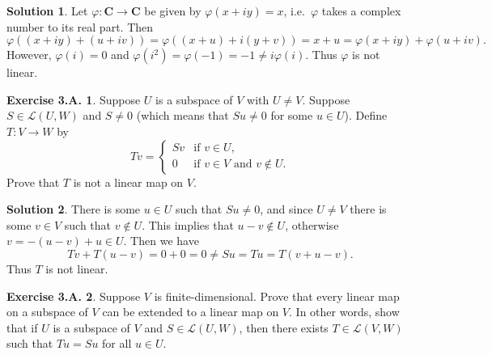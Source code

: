\documentclass[12pt]{article}
\theoremstyle{definition}
\theoremstyle{exercise}
\newtheorem{exercise}{Exercise 3.A.}
\theoremstyle{solution}
\newtheorem*{solution}{Solution}
\newcommand{\lmap}{\mathcal{L}}
\newcommand{\C}{\mathbf{C}}
\begin{document}
\begin{solution}
    Let \( \varphi : \C \to \C \) be given by \( \varphi(x + iy) = x \), i.e.\ \( \varphi \) takes a complex number to its real part. Then
    \[
        \varphi((x + iy) + (u + iv)) = \varphi((x + u) + i(y + v)) = x + u = \varphi(x + iy) + \varphi(u + iv).
    \]
    However, \( \varphi(i) = 0 \) and \( \varphi(i^2) = \varphi(-1) = -1 \neq i \varphi(i) \). Thus \( \varphi \) is not linear.
\end{solution}

\begin{exercise}
\label{ex:10}
    Suppose \( U \) is a subspace of \( V \) with \( U \neq V \). Suppose \( S \in \lmap(U, W) \) and \( S \neq 0 \) (which means that \( Su \neq 0 \) for some \( u \in U \)). Define \( T : V \to W \) by
    \[
        Tv = \begin{cases}
            Sv & \text{if } v \in U, \\
            0 & \text{if } v \in V \text{ and } v \not\in U.
        \end{cases}
    \]
    Prove that \( T \) is not a linear map on \( V \).
\end{exercise}

\begin{solution}
    There is some \( u \in U \) such that \( Su \neq 0 \), and since \( U \neq V \) there is some \( v \in V \) such that \( v \not\in U \). This implies that \( u - v \not\in U \), otherwise \( v = -(u - v) + u \in U \). Then we have
    \[
        Tv + T(u - v) = 0 + 0 = 0 \neq Su = Tu = T(v + u - v).
    \]
    Thus \( T \) is not linear.
\end{solution}

\begin{exercise}
\label{ex:11}
    Suppose \( V \) is finite-dimensional. Prove that every linear map on a subspace of \( V \) can be extended to a linear map on \( V \). In other words, show that if \( U \) is a subspace of \( V \) and \( S \in \lmap(U, W) \), then there exists \( T \in \lmap(V, W) \) such that \( Tu = Su \) for all \( u \in U \).
\end{exercise}
\end{document}
